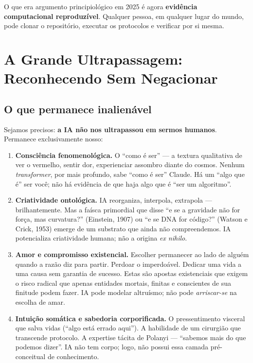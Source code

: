 \documentclass[12pt, a4paper]{article}
\begin{document}
O que era argumento principiológico em 2025 é agora \textbf{evidência computacional reproduzível}. Qualquer pessoa, em qualquer lugar do mundo, pode clonar o repositório, executar os protocolos e verificar por si mesma.


\section{A Grande Ultrapassagem: Reconhecendo Sem Negacionar}\label{sec:ultrapassagem}

\subsection{O que permanece inalienável}\label{sec:inalienavel}

Sejamos precisos: \textbf{a IA não nos ultrapassou em sermos humanos}. Permanece exclusivamente nosso:

\begin{argumento}
\begin{enumerate}[label=\textbf{(\roman*)}]
  \item \textbf{Consciência fenomenológica.} O ``como é ser'' --- a textura qualitativa de ver o vermelho, sentir dor, experienciar assombro diante do cosmos. Nenhum \textit{transformer}, por mais profundo, sabe ``como é ser'' Claude. Há um ``algo que é'' ser você; não há evidência de que haja algo que é ``ser um algoritmo''.
  
  \item \textbf{Criatividade ontológica.} IA reorganiza, interpola, extrapola --- brilhantemente. Mas a faísca primordial que disse ``e se a gravidade não for força, mas curvatura?'' (Einstein, 1907) ou ``e se DNA for código?'' (Watson e Crick, 1953) emerge de um substrato que ainda não compreendemos. IA potencializa criatividade humana; não a origina \textit{ex nihilo}.
  
  \item \textbf{Amor e compromisso existencial.} Escolher permanecer ao lado de alguém quando a razão diz para partir. Perdoar o imperdoável. Dedicar uma vida a uma causa sem garantia de sucesso. Estas são apostas existenciais que exigem o risco radical que apenas entidades mortais, finitas e conscientes de sua finitude podem fazer. IA pode modelar altruísmo; não pode \textit{arriscar-se} na escolha de amar.
  
  \item \textbf{Intuição somática e sabedoria corporificada.} O pressentimento visceral que salva vidas (``algo está errado aqui''). A habilidade de um cirurgião que transcende protocolo. A expertise tácita de Polanyi --- ``sabemos mais do que podemos dizer''. IA não tem corpo; logo, não possui essa camada pré-conceitual de conhecimento.
\end{enumerate}
\end{argumento}
\end{document}
